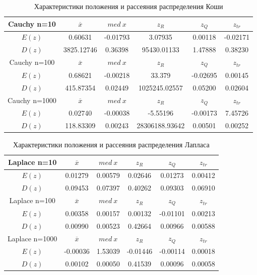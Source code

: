 \begin{table}[H]
	\begin{center}
		\begin{tabular}{|c||c|c|c|c|c|}
			\hline
			Cauchy n=10 & $\overline{x} $ & $med\:x$ & $z_{R}$ & $z_{Q}$ & $z_{tr}$ \\
			\hline\hline
			$E(z)$ & 0.60631 & -0.01793& 3.07935 & 0.00118 & -0.02171 \\
			\hline
			$D(z)$ & 3825.12746 & 0.36398 & 95430.01133 & 1.47888 & 0.38230 \\
			\hline\hline
			Cauchy n=100 & $\overline{x} $ & $med\:x$ & $z_{R}$ & $z_{Q}$ & $z_{tr}$ \\
			\hline\hline
			$E(z)$ & 0.68621 & -0.00218 & 33.379 & -0.02695 & 0.00145 \\
			\hline
			$D(z)$ &415.87354  &0.02449 & 1025245.02557 & 0.05200 &  0.02604\\
			\hline\hline
			Cauchy n=1000 & $\overline{x} $ & $med\:x$ & $z_{R}$ & $z_{Q}$ & $z_{tr}$ \\
			\hline\hline
			$E(z)$ & 0.02740 &-0.00038 & -5.55196 & -0.00173 & 7.45726 \\
			\hline
			$D(z)$ & 118.83309 &0.00243 & 28306188.93642 & 0.00501 &0.00252  \\
			\hline
		\end{tabular}
	\end{center}
	\caption{Характеристики положения и рассеяния распределения Коши}
\end{table}

\begin{table}[H]
	\begin{center}
		\begin{tabular}{|c||c|c|c|c|c|}
			\hline
			Laplace n=10 & $\overline{x} $ & $med\:x$ & $z_{R}$ & $z_{Q}$ & $z_{tr}$ \\
			\hline\hline
			$E(z)$ & 0.01279 &0.00579 & 0.02646 & 0.01273 & 0.00412 \\
			\hline
			$D(z)$ & 0.09453 &  0.07397 &  0.40262 &0.09303  &  0.06910 \\
			\hline\hline
			Laplace n=100 & $\overline{x} $ & $med\:x$ & $z_{R}$ & $z_{Q}$ & $z_{tr}$ \\
			\hline\hline
			$E(z)$ &0.00358  & 0.00157&0.00132  & -0.01101 & 0.00213 \\
			\hline
			$D(z)$ & 0.00990 &0.00523 & 0.42664 & 0.00966 & 0.00588 \\
			\hline\hline
			Laplace n=1000 & $\overline{x} $ & $med\:x$ & $z_{R}$ & $z_{Q}$ & $z_{tr}$ \\
			\hline\hline
			$E(z)$ & -0.00036 & 1.53039 & -0.01446 & -0.00114 & 0.00018 \\
			\hline
			$D(z)$ & 0.00102 &0.00050 & 0.41539 & 0.00096 & 0.00058  \\
			\hline
		\end{tabular}
	\end{center}
	\caption{Характеристики положения и рассеяния распределения Лапласа}
\end{table} 

